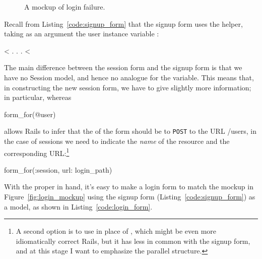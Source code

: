 \begin{figure}
\begin{center}
\end{center}
\caption{A mockup of login failure.\label{fig:login_failure_mockup}}
\end{figure}

Recall from Listing~\ref{code:signup_form} that the signup form uses the  helper, taking as an argument the user instance variable :

\begin{code}
<%
  .
  .
  .
<%
\end{code}

\noindent The main difference between the session form and the signup form is that we have no Session model, and hence no analogue for the  variable. This means that, in constructing the new session form, we have to give  slightly more information; in particular, whereas

\begin{code}
form_for(@user)
\end{code}

\noindent allows Rails to infer that the  of the form should be to \texttt{POST} to the URL /users, in the case of sessions we need to indicate the \emph{name} of the resource and the corresponding URL:\footnote{A second option is to use  in place of , which might be even more idiomatically correct Rails, but it has less in common with the signup form, and at this stage I want to emphasize the parallel structure.}

\begin{code}
form_for(:session, url: login_path)
\end{code}

With the proper  in hand, it's easy to make a login form to match the mockup in Figure~\ref{fig:login_mockup} using the signup form (Listing~\ref{code:signup_form}) as a model, as shown in Listing~\ref{code:login_form}.

